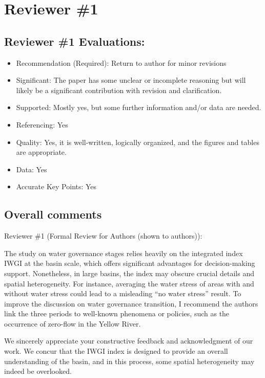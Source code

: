 \section{Reviewer \#1}\label{reviewer_1}

\subsection*{Reviewer \#1 Evaluations:}

\begin{itemize}
	\item Recommendation (Required): Return to author for minor revisions
	\item Significant: The paper has some unclear or incomplete reasoning but will likely be a significant contribution with revision and clarification.
	\item Supported: Mostly yes, but some further information and/or data are needed.
	\item Referencing: Yes
	\item Quality: Yes, it is well-written, logically organized, and the figures and tables are appropriate.
	\item Data: Yes
	\item Accurate Key Points: Yes
\end{itemize}

\subsection*{Overall comments}

Reviewer \#1 (Formal Review for Authors (shown to authors)):

\RC{} The study on water governance stages relies heavily on the integrated index IWGI at the basin scale, which offers significant advantages for decision-making support. Nonetheless, in large basins, the index may obscure crucial details and spatial heterogeneity. For instance, averaging the water stress of areas with and without water stress could lead to a misleading ``no water stress'' result. To improve the discussion on water governance transition, I recommend the authors link the three periods to well-known phenomena or policies, such as the occurrence of zero-flow in the Yellow River.

\AR{} We sincerely appreciate your constructive feedback and acknowledgment of our work. We concur that the IWGI index is designed to provide an overall understanding of the basin, and in this process, some spatial heterogeneity may indeed be overlooked.

